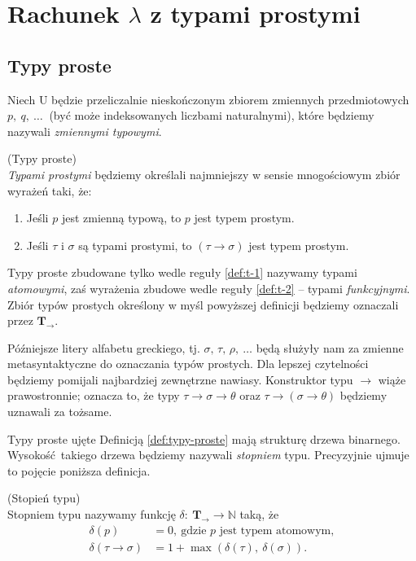 \section{Rachunek \(\lambda\) z typami prostymi}
\subsection{Typy proste}\label{ssec:typy-proste}
Niech \(\mathrm{U}\) będzie przeliczalnie nieskończonym zbiorem zmiennych przedmiotowych \(p,\ q,\ \dots\ \) (być może indeksowanych liczbami naturalnymi), które będziemy nazywali \emph{zmiennymi typowymi}.\begin{definicja}\label{def:typy-proste}(Typy proste)\\
\emph{Typami prostymi} będziemy określali najmniejszy w sensie mnogościowym zbiór wyrażeń taki, że:
\begin{enumerate}[label=(ST\arabic*)]
  \setlength\itemsep{0em}
  \item Jeśli \(p\) jest zmienną typową, to \(p\) jest typem prostym.\label{def:t-1}
  \item Jeśli \(\tau\) i \(\sigma\) są typami prostymi, to \(\left(\tau\to\sigma\right)\) jest typem prostym.\label{def:t-2}
\end{enumerate}
\end{definicja}

Typy proste zbudowane tylko wedle reguły \ref{def:t-1} nazywamy typami \emph{atomowymi}, zaś wyrażenia zbudowe wedle reguły \ref{def:t-2} -- typami \emph{funkcyjnymi}. Zbiór typów prostych określony w myśl powyższej definicji będziemy oznaczali przez \(\mathbf{T_\to}\).

Późniejsze litery alfabetu greckiego, tj. \(\sigma,\, \tau,\, \rho,\ \dots\) będą służyły nam za zmienne metasyntaktyczne do oznaczania typów prostych. Dla lepszej czytelności będziemy pomijali najbardziej zewnętrzne nawiasy. Konstruktor typu \(\to\) wiąże prawostronnie; oznacza to, że typy \(\tau\to\sigma\to\theta\) oraz \(\tau\to(\sigma\to\theta)\) będziemy uznawali za tożsame.

Typy proste ujęte Definicją \ref{def:typy-proste} mają strukturę drzewa binarnego. Wysokość takiego drzewa będziemy nazywali \emph{stopniem} typu. Precyzyjnie ujmuje to pojęcie poniższa definicja.
\begin{definicja}\label{def:stopien-typu}(Stopień typu)\\
  Stopniem typu nazywamy funkcję \(\delta :\: \mathbf{T}_\to \longrightarrow \mathbb{N}\) taką, że
  \begin{align*}
    \delta(p) &= 0,\ \text{gdzie \(p\) jest typem atomowym},\\
    \delta(\tau\to\sigma)&=1 + \max\left(\delta(\tau),\ \delta(\sigma)\right).
  \end{align*}
\end{definicja}

